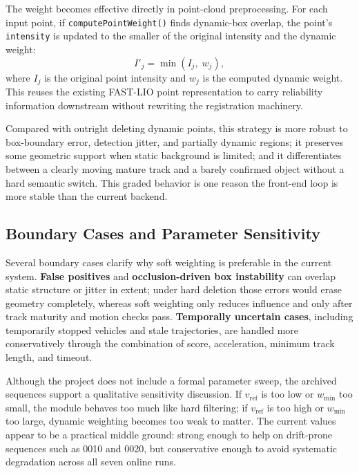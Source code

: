 \documentclass[a4paper,12pt]{article}
\begin{document}
The weight becomes effective directly in point-cloud preprocessing. For each input point, if \texttt{computePointWeight()} finds dynamic-box overlap, the point's \texttt{intensity} is updated to the smaller of the original intensity and the dynamic weight:
\begin{equation}
I'_j = \min(I_j,\; w_j),
\end{equation}
where \(I_j\) is the original point intensity and \(w_j\) is the computed dynamic weight. This reuses the existing FAST-LIO point representation to carry reliability information downstream without rewriting the registration machinery.

Compared with outright deleting dynamic points, this strategy is more robust to box-boundary error, detection jitter, and partially dynamic regions; it preserves some geometric support when static background is limited; and it differentiates between a clearly moving mature track and a barely confirmed object without a hard semantic switch. This graded behavior is one reason the front-end loop is more stable than the current backend.

\subsection{Boundary Cases and Parameter Sensitivity}
Several boundary cases clarify why soft weighting is preferable in the current system. \textbf{False positives} and \textbf{occlusion-driven box instability} can overlap static structure or jitter in extent; under hard deletion those errors would erase geometry completely, whereas soft weighting only reduces influence and only after track maturity and motion checks pass. \textbf{Temporally uncertain cases}, including temporarily stopped vehicles and stale trajectories, are handled more conservatively through the combination of score, acceleration, minimum track length, and timeout.

Although the project does not include a formal parameter sweep, the archived sequences support a qualitative sensitivity discussion. If \(v_{\mathrm{ref}}\) is too low or \(w_{\min}\) too small, the module behaves too much like hard filtering; if \(v_{\mathrm{ref}}\) is too high or \(w_{\min}\) too large, dynamic weighting becomes too weak to matter. The current values appear to be a practical middle ground: strong enough to help on drift-prone sequences such as 0010 and 0020, but conservative enough to avoid systematic degradation across all seven online runs.
\end{document}
